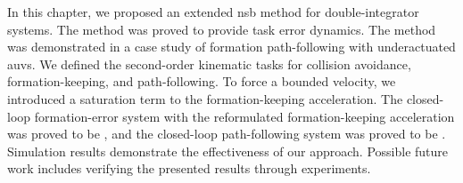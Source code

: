 In this chapter, we proposed an extended \gls{nsb} method for double-integrator systems. The method was proved to provide  task error dynamics. The method was demonstrated in a case study of formation path-following with underactuated \glspl{auv}. We defined the second-order kinematic tasks for collision avoidance, formation-keeping, and path-following. To force a bounded velocity, we introduced a saturation term to the formation-keeping acceleration. The closed-loop formation-error system with the reformulated formation-keeping acceleration was proved to be , and the closed-loop path-following system was proved to be . Simulation results demonstrate the effectiveness of our approach. Possible future work includes verifying the presented results through experiments.
